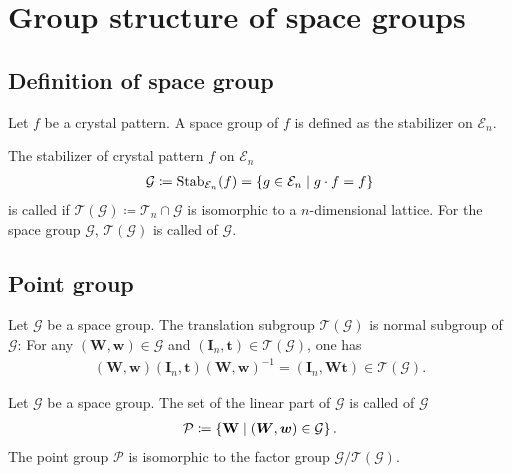 \section{\label{sec:group_structure}Group structure of space groups}

\subsection{\label{sec:def_space_group}Definition of space group}

Let $f$ be a crystal pattern.
A space group of $f$ is defined as the stabilizer on $\mathcal{E}_{n}$.

\begin{screen}
  \begin{defn}
    The stabilizer of crystal pattern $f$ on $\mathcal{E}_{n}$
    \begin{align}
      \mathcal{G} \coloneqq \mathrm{Stab}_{\mathcal{E}_{n}} (f) = \left\{  g \in \mathcal{E}_{n}  \mathrel{}\middle|\mathrel{}  g \cdot f = f  \right\}
    \end{align}
    is called  if $\mathcal{T}(\mathcal{G}) \coloneqq \mathcal{T}_{n} \cap \mathcal{G}$ is isomorphic to a $n$-dimensional lattice.
    For the space group $\mathcal{G}$, $\mathcal{T}(\mathcal{G})$ is called  of $\mathcal{G}$.
  \end{defn}
\end{screen}

\subsection{Point group}

Let $\mathcal{G}$ be a space group.
The translation subgroup $\mathcal{T}(\mathcal{G})$ is normal subgroup of $\mathcal{G}$:
For any $ (\mathbf{W}, \mathbf{w}) \in \mathcal{G}$ and $(\mathbf{I}_{n}, \mathbf{t}) \in \mathcal{T}(\mathcal{G})$, one has
\begin{align}
  (\bm{W}, \bm{w}) (\bm{I}_{n}, \bm{t}) (\bm{W}, \bm{w})^{-1} = (\bm{I}_{n}, \bm{Wt}) \in \mathcal{T}(\mathcal{G}).
\end{align}

\begin{screen}
  \begin{defn}
    Let $\mathcal{G}$ be a space group.
    The set of the linear part of $\mathcal{G}$ is called  of $\mathcal{G}$
    \begin{align}
      \mathcal{P} \coloneqq \left\{  \mathbf{W}  \mathrel{}\middle|\mathrel{}  (\bm{W}, \bm{w}) \in \mathcal{G}  \right\}.
    \end{align}
    The point group $\mathcal{P}$ is isomorphic to the factor group $\mathcal{G} / \mathcal{T}(\mathcal{G})$.
  \end{defn}
\end{screen}

